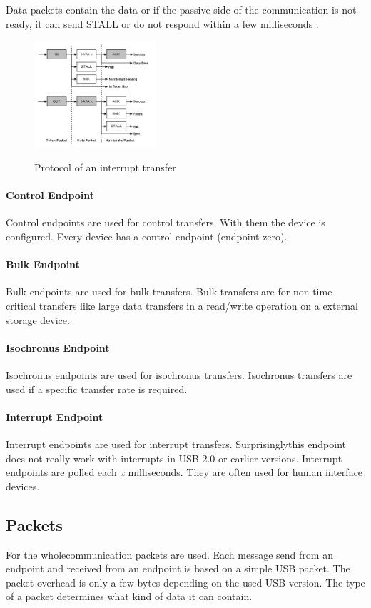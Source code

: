 \documentclass{acm_proc_article-sp}
\begin{document}
Data packets contain the data or if the passive side of the communication is not ready, it can
send STALL or do not respond within a few milliseconds \cite{beyond}.
\begin{figure}
\centering
\includegraphics[width=0.4\textwidth]{interrupttransfer.png}
\label{fig:interrupttransfer}
\caption{Protocol of an interrupt transfer \cite{beyond}}
\end{figure}
\paragraph{Control Endpoint}
Control endpoints are used for control transfers.
With them the device is configured.
Every device has a control endpoint (endpoint zero).

\paragraph{Bulk Endpoint}
Bulk endpoints are used for bulk transfers.
Bulk transfers are for non time critical transfers like large data transfers in a read/write operation on a external storage device.

\paragraph{Isochronus Endpoint}
Isochronus endpoints are used for isochronus transfers.
Isochronus transfers are used if a specific transfer rate is required.

\paragraph{Interrupt Endpoint}
Interrupt endpoints are used for interrupt transfers.
Surprisinglythis endpoint does not really work with interrupts in USB 2.0 or earlier versions.
Interrupt endpoints are polled each \emph{x} milliseconds.
They are often used for human interface devices.

\subsection{Packets}
For the wholecommunication packets are used.
Each message send from an endpoint and received from an endpoint is based on a simple USB packet.
The packet overhead is only a few bytes depending on the used USB version.
The type of a packet determines what kind of data it can contain.
\end{document}
